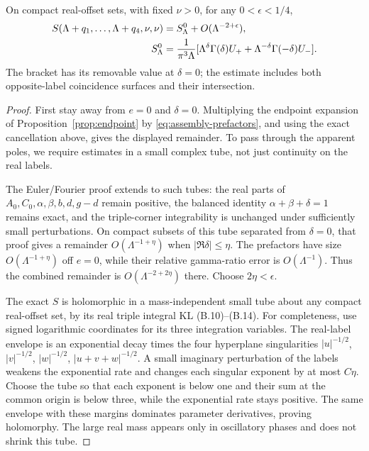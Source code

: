 \begin{theorem}
On compact real-offset sets, with fixed $\nu>0$, for any
$0<\epsilon<1/4$,
\begin{align}
 S(\Lambda+q_1,\ldots,\Lambda+q_4,\nu,\nu)
 &=S_\Lambda^0+O(\Lambda^{-2+\epsilon}),\notag\\
 S_\Lambda^0&=\frac{1}{\pi^3\Lambda}
   [\Lambda^\delta\Gamma(\delta)U_+
       +\Lambda^{-\delta}\Gamma(-\delta)U_-].
 \label{eq:assembled-asymptotic}
\end{align}
The bracket has its removable value at $\delta=0$; the estimate includes
both opposite-label coincidence surfaces and their intersection.
\label{thm:assembled-remainder}
\end{theorem}
\begin{proof}
First stay away from $e=0$ and $\delta=0$. Multiplying the endpoint
expansion of Proposition~\ref{prop:endpoint} by
\eqref{eq:assembly-prefactors}, and using the exact cancellation above,
gives the displayed remainder. To pass through the apparent poles,
we require estimates in a small complex tube, not just continuity on
the real labels.

The Euler/Fourier proof extends to such tubes: the real parts of
$A_0,C_0,\alpha,\beta,b,d,g-d$ remain positive, the balanced identity
$\alpha+\beta+\delta=1$ remains exact, and the triple-corner integrability
is unchanged under sufficiently small perturbations. On compact subsets
of this tube separated from $\delta=0$, that proof gives a remainder
$O(\Lambda^{-1+\eta})$ when $|\Re\delta|\le\eta$.
The prefactors have size $O(\Lambda^{-1+\eta})$ off $e=0$, while their
relative gamma-ratio error is $O(\Lambda^{-1})$. Thus the combined
remainder is $O(\Lambda^{-2+2\eta})$ there. Choose $2\eta<\epsilon$.

The exact $S$ is holomorphic in a mass-independent small tube about any
compact real-offset set, by its real triple integral KL (B.10)--(B.14).
For completeness, use signed logarithmic coordinates for its three
integration variables. The real-label envelope is an exponential
decay times the four hyperplane singularities
$|u|^{-1/2}$, $|v|^{-1/2}$, $|w|^{-1/2}$, $|u+v+w|^{-1/2}$.
A small imaginary perturbation of the labels weakens the exponential
rate and changes each singular exponent by at most $C\eta$.
Choose the tube so that each exponent is below one and their sum at
the common origin is below three, while the exponential rate stays
positive. The same envelope with these margins dominates parameter
derivatives, proving holomorphy. The large real mass appears only in
oscillatory phases and does not shrink this tube.


\end{proof}
